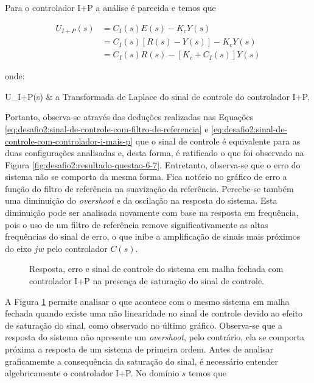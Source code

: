 Para o controlador I+P a análise é parecida e temos que

\begin{equation}
    \label{eq:desafio2:sinal-de-controle-com-controlador-i-mais-p}
    \begin{split}
        U_{I+P}(s) &= C_{I}(s)E(s) - K_{c}Y(s) \\
                   &= C_{I}(s)[R(s) - Y(s)] - K_{c}Y(s) \\
                   &= C_{I}(s)R(s) - [K_{c} + C_{I}(s)]Y(s)
    \end{split}
\end{equation}

onde:

\begin{conditions*}
    U_{I+P}(s) & a Transformada de Laplace do sinal de controle do controlador I+P.
\end{conditions*}

Portanto, observa-se através das deduções realizadas nas Equações
\ref{eq:desafio2:sinal-de-controle-com-filtro-de-referencia} e
\ref{eq:desafio2:sinal-de-controle-com-controlador-i-mais-p} que o sinal de
controle é equivalente para as duas configurações analisadas e, desta forma, é
ratificado o que foi observado na Figura
\ref{fig:desafio2:resultado-questao-6-7}. Entretanto, observa-se que o erro do
sistema não se comporta da mesma forma. Fica notório no gráfico de erro a função
do filtro de referência na suavização da referência. Percebe-se também uma
diminuição do \textit{overshoot} e da oscilação na resposta do sistema. Esta
diminuição pode ser analisada novamente com base na resposta em frequência, pois
o uso de um filtro de referência remove significativamente as altas frequências
do sinal de erro, o que inibe a amplificação de sinais mais próximos do eixo
$jw$ pelo controlador $C(s)$.

\begin{figure}[!ht]
    \caption{Resposta, erro e sinal de controle do sistema em malha fechada com
    controlador I+P na presença de saturação do sinal de controle.}
    \vspace{-10pt}
    \hspace{-30pt}
    \label{fig:desafio2:resultado-questao-8}
    \begin{minipage}{\linewidth}
        
    \end{minipage}
\end{figure}

A Figura \ref{fig:desafio2:resultado-questao-8} permite analisar o que acontece
com o mesmo sistema em malha fechada quando existe uma não linearidade no sinal
de controle devido ao efeito de saturação do sinal, como observado no último
gráfico. Observa-se que a resposta do sistema não apresente um
\textit{overshoot}, pelo contrário, ela se comporta próxima a resposta de um
sistema de primeira ordem. Antes de analisar graficamemte a consequência da
saturação do sinal, é necessário entender algebricamente o controlador I+P. No
domínio $s$ temos que 

